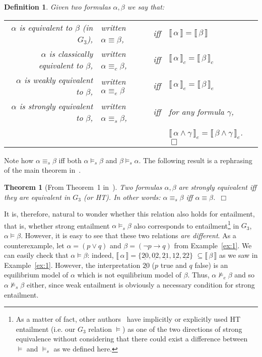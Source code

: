 \documentclass{tlp}
\newcommand{\den}[1]{\llbracket \, #1 \, \rrbracket}
\def\qed{~\hfill$\Box$}
\newtheorem{definition}{Definition}
\newtheorem{theorem}{Theorem}
\newcommand{\str}[1]{\underline{#1}}
\begin{document}
\begin{definition}
Given two formulas $\alpha, \beta$ we say that:

\begin{tabular}{rl@{\!}c@{\!}l}
$\alpha$ is \emph{equivalent} to $\beta$ (in $G_3$), & written $\alpha \equiv \beta$, & iff & $\den{\alpha}=\den{\beta}$\\
$\alpha$ is \emph{classically equivalent} to $\beta$, & written $\alpha \equiv_c \beta$, & iff & $\den{\alpha}_c = \den{\beta}_c$\\
$\alpha$ is \emph{weakly equivalent} to $\beta$, & written $\alpha \equiv_{e} \beta$ & iff & $\den{\alpha}_{e} = \den{\beta}_{e}$\\
$\alpha$ is \emph{strongly equivalent} to $\beta$, & written $\alpha \equiv_{s} \beta$, & iff & for any formula $\gamma$, \\
& & & $\den{\alpha \wedge \gamma}_e = \den{\beta \wedge \gamma}_e$. \qed
\end{tabular}
\end{definition}

Note how $\alpha \equiv_s \beta$ iff both $\alpha \models_s \beta$ and $\beta \models_s \alpha$. The following result is a rephrasing of the main theorem in~\cite{LPV01}.

\begin{theorem}[From Theorem~1 in~\cite{LPV01}]\label{th:se}
Two formulas $\alpha, \beta$ are strongly equivalent iff they are equivalent in $G_3$ (or HT). In other words: $\alpha \equiv_s \beta$ iff $\alpha \equiv \beta$.\qed
\end{theorem}

It is, therefore, natural to wonder whether this relation also holds for entailment, that is, whether strong entailment $\alpha \models_s \beta$ also corresponds to entailment\footnote{As a matter of fact, other authors~\cite{DSTW08,SL14} have implicitly or explicitly used HT entailment (i.e. our $G_3$ relation $\models$) as one of the two directions of strong equivalence without considering that there could exist a difference between $\models$ and $\models_s$ as we defined here.} in $G_3$, $\alpha \models \beta$.  However, it is easy to see that these two relations \emph{are different}. As a counterexample, let $\alpha=(p \vee q)$ and $\beta=(\neg p \rightarrow q)$ from Example~\ref{ex:1}. We can easily check that $\alpha \models \beta$: indeed, $\den{\alpha}=\{\str{20},\str{02},\str{21},\str{12},\str{22}\}$ $\subseteq \den{\beta}$ as we saw in Example~\ref{ex:1}. However, the interpretation $\str{20}$ ($p$ true and $q$ false) is an equilibrium model of $\alpha$ which is not equilibrium model of $\beta$. Thus, $\alpha \not\models_e \beta$ and so $\alpha \not\models_s \beta$ either, since weak entailment is obviously a necessary condition for strong entailment.
\end{document}
